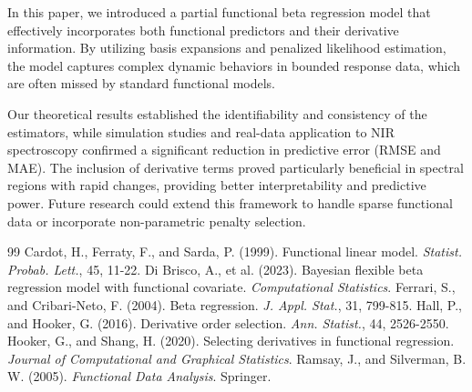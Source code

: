 \documentclass[twoside]{article}
\begin{document}
In this paper, we introduced a partial functional beta regression model that effectively incorporates both functional predictors and their derivative information. By utilizing basis expansions and penalized likelihood estimation, the model captures complex dynamic behaviors in bounded response data, which are often missed by standard functional models.

Our theoretical results established the identifiability and consistency of the estimators, while simulation studies and real-data application to NIR spectroscopy confirmed a significant reduction in predictive error (RMSE and MAE). The inclusion of derivative terms proved particularly beneficial in spectral regions with rapid changes, providing better interpretability and predictive power. Future research could extend this framework to handle sparse functional data or incorporate non-parametric penalty selection.

	\begin{thebibliography}{99}
		 Cardot, H., Ferraty, F., and Sarda, P. (1999). Functional linear model. \emph{Statist. Probab. Lett.}, 45, 11-22.
		 Di Brisco, A., et al. (2023). Bayesian flexible beta regression model with functional covariate. \emph{Computational Statistics}.
		 Ferrari, S., and Cribari-Neto, F. (2004). Beta regression. \emph{J. Appl. Stat.}, 31, 799-815.
		 Hall, P., and Hooker, G. (2016). Derivative order selection. \emph{Ann. Statist.}, 44, 2526-2550.
		 Hooker, G., and Shang, H. (2020). Selecting derivatives in functional regression. \emph{Journal of Computational and Graphical Statistics}.
		 Ramsay, J., and Silverman, B. W. (2005). \emph{Functional Data Analysis}. Springer.
	\end{thebibliography}
	
\end{document}
